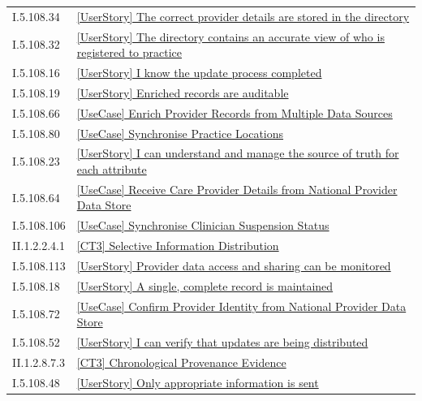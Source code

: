 \begin{longtable}{p{.22\linewidth}p{.73\linewidth}}
I.5.108.34 & \hyperref[element:7dc7fc1727e848a6b1e3a81122a7ed28]{[UserStory] The correct provider details are stored in the directory} \\
I.5.108.32 & \hyperref[element:8261774ed8044968af70b0486cbb38b9]{[UserStory] The directory contains an accurate view of who is registered to practice} \\
I.5.108.16 & \hyperref[element:8273eb96bf16434a970554ba88a357ba]{[UserStory] I know the update process completed} \\
I.5.108.19 & \hyperref[element:828efccf828444b489709a349a2f5846]{[UserStory] Enriched records are auditable} \\
I.5.108.66 & \hyperref[element:82d9b3c0f2d2460fbf7e9d91ecbb7078]{[UseCase] Enrich Provider Records from Multiple Data Sources} \\
I.5.108.80 & \hyperref[element:8399f571b08a4d4e9a313a9e4c8c4858]{[UseCase] Synchronise Practice Locations} \\
I.5.108.23 & \hyperref[element:83d3ad57ac9340e399ebb3a0da9d2e4d]{[UserStory] I can understand and manage the source of truth for each attribute} \\
I.5.108.64 & \hyperref[element:86cdfd2846a143c48b067f7be6fe4074]{[UseCase] Receive Care Provider Details from National Provider Data Store} \\
I.5.108.106 & \hyperref[element:8739f6b448ad4521849540c808fb0f59]{[UseCase] Synchronise Clinician Suspension Status} \\
II.1.2.2.4.1 & \hyperref[element:87869a1eec5f4c7cb87600a06cc8fd6e]{[CT3] Selective Information Distribution} \\
I.5.108.113 & \hyperref[element:8960c608de434d9bb14fbe639247ad26]{[UserStory] Provider data access and sharing can be monitored} \\
I.5.108.18 & \hyperref[element:8c28d12f76024731bb192511aaff0d5f]{[UserStory] A single, complete record is maintained} \\
I.5.108.72 & \hyperref[element:8d89cfb7e01d4a6cb317efa0d1a4db82]{[UseCase] Confirm Provider Identity from National Provider Data Store} \\
I.5.108.52 & \hyperref[element:910fd1b3e5814eecbb14131832a9255c]{[UserStory] I can verify that updates are being distributed} \\
II.1.2.8.7.3 & \hyperref[element:95c06dba5448453992d55106b19f977d]{[CT3] Chronological Provenance Evidence} \\
I.5.108.48 & \hyperref[element:9683330a98b24e54bc31ee4739531172]{[UserStory] Only appropriate information is sent} \\

\end{longtable}
